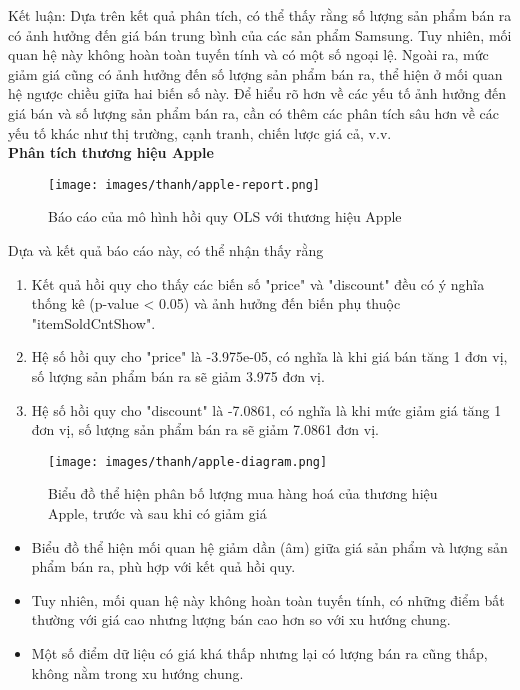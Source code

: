 Kết luận: Dựa trên kết quả phân tích, có thể thấy rằng số lượng sản phẩm bán ra có ảnh hưởng đến giá bán trung bình của các sản phẩm Samsung. Tuy nhiên, mối quan hệ này không hoàn toàn tuyến tính và có một số ngoại lệ. Ngoài ra, mức giảm giá cũng có ảnh hưởng đến số lượng sản phẩm bán ra, thể hiện ở mối quan hệ ngược chiều giữa hai biến số này. Để hiểu rõ hơn về các yếu tố ảnh hưởng đến giá bán và số lượng sản phẩm bán ra, cần có thêm các phân tích sâu hơn về các yếu tố khác như thị trường, cạnh tranh, chiến lược giá cả, v.v. \\


\textbf{Phân tích thương hiệu Apple}
\begin{figure}[H]
    \centering
    \texttt{[image: images/thanh/apple-report.png]}
    \caption{Báo cáo của mô hình hồi quy OLS với thương hiệu Apple}
    \label{fig:apple-report}
\end{figure}

Dựa và kết quả báo cáo này, có thể nhận thấy rằng
\begin{enumerate}
  \item Kết quả hồi quy cho thấy các biến số "price" và "discount" đều có ý nghĩa thống kê (p-value < 0.05) và ảnh hưởng đến biến phụ thuộc "itemSoldCntShow".
  \item Hệ số hồi quy cho "price" là -3.975e-05, có nghĩa là khi giá bán tăng 1 đơn vị, số lượng sản phẩm bán ra sẽ giảm 3.975 đơn vị.
  \item Hệ số hồi quy cho "discount" là -7.0861, có nghĩa là khi mức giảm giá tăng 1 đơn vị, số lượng sản phẩm bán ra sẽ giảm 7.0861 đơn vị.
\end{enumerate}

\begin{figure}[H]
    \centering
    \texttt{[image: images/thanh/apple-diagram.png]}
    \caption{Biểu đồ thể hiện phân bố lượng mua hàng hoá của thương hiệu Apple, trước và sau khi có giảm giá}
    \label{fig:apple-diagram}
\end{figure}

\begin{itemize}
    \item Biểu đồ thể hiện mối quan hệ giảm dần (âm) giữa giá sản phẩm và lượng sản phẩm bán ra, phù hợp với kết quả hồi quy.
    \item Tuy nhiên, mối quan hệ này không hoàn toàn tuyến tính, có những điểm bất thường với giá cao nhưng lượng bán cao hơn so với xu hướng chung.
    \item Một số điểm dữ liệu có giá khá thấp nhưng lại có lượng bán ra cũng thấp, không nằm trong xu hướng chung.
\end{itemize}
   
